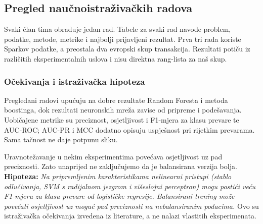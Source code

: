 \subsection{Pregled naučnoistraživačkih radova}\label{sec:radovi}
Svaki član tima obrađuje jedan rad. Tabele za svaki rad navode problem, podatke,
metode, metrike i najbolji prijavljeni rezultat. Prva tri rada koriste Sparkov
podatke, a preostala dva evropski skup transakcija. Rezultati potiču iz različitih
eksperimentalnih uslova i nisu direktna rang-lista za naš skup.







\subsubsection*{Očekivanja i istraživačka hipoteza}
Pregledani radovi upućuju na dobre rezultate Random Foresta i metoda boostinga,
dok rezultati neuronskih mreža zavise od pripreme i podešavanja. Uobičajene metrike su
preciznost, osjetljivost i F1-mjera za klasu prevare te AUC-ROC; AUC-PR i MCC dodatno
opisuju uspješnost pri rijetkim prevarama. Sama tačnost ne daje potpunu sliku.

Uravnotežavanje u nekim eksperimentima povećava osjetljivost uz pad preciznosti.
Zato unaprijed ne zaključujemo da je balansirana verzija bolja.
\textbf{Hipoteza:} \emph{Na pripremljenim karakteristikama nelinearni pristupi
(stablo odlučivanja, SVM s radijalnom jezgrom i višeslojni perceptron) mogu postići
veću F1-mjeru za klasu prevare od logističke regresije. Balansirani trening može
povećati osjetljivost uz moguć pad preciznosti na nebalansiranim podacima.}
Ovo su istraživačka očekivanja izvedena iz literature, a ne nalazi vlastitih eksperimenata.
